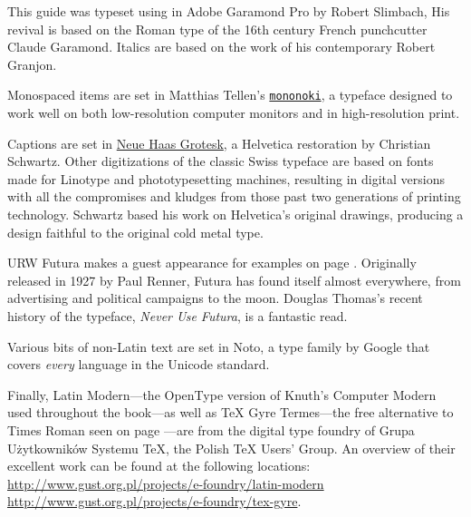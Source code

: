 This guide was typeset using \LuaLaTeX{} in Adobe Garamond Pro by
Robert Slimbach,
His revival is based on the Roman type of
the 16{th} century French
punchcutter Claude Garamond.
Italics are based on the work of his contemporary Robert Granjon.

Monospaced items are set in Matthias Tellen's
\href{https://madmalik.github.io/mononoki/}{\texttt{mononoki}},
a typeface designed to work well on both low-resolution computer monitors
and in high-resolution print.

Captions are set in
\href{http://www.fontbureau.com/NHG/}{\textsf{\small Neue Haas Grotesk}},
a Helvetica restoration by Christian Schwartz.
Other digitizations of the classic Swiss typeface are based on fonts made for
Linotype and phototypesetting machines,
resulting in digital versions with all the compromises and kludges from those
past two generations of printing technology.
Schwartz based his work on Helvetica's original drawings,
producing a design faithful to the original cold metal type.

{URW Futura}
makes a guest appearance
for examples on page \pageref{typography}.
Originally released in 1927 by Paul Renner,
Futura has found itself almost everywhere,
from advertising and political campaigns to the moon.
Douglas Thomas's recent history of the typeface,
\textit{Never Use Futura}, is a fantastic read.

Various bits of non-Latin text are set in
{Noto},
a type family by Google that covers \emph{every} language
in the Unicode standard.

Finally,
Latin Modern---the OpenType version of Knuth's Computer Modern used throughout
the book---as well
as {\TeX{} Gyre Termes}---the
free alternative to Times Roman seen on page \pageref{typography}---are from
the digital type foundry of Grupa Użytkowników Systemu \TeX{},
the Polish \TeX{} Users' Group.
An overview of their excellent work can be found at the following locations:\\
\url{http://www.gust.org.pl/projects/e-foundry/latin-modern} \\
\url{http://www.gust.org.pl/projects/e-foundry/tex-gyre}.
